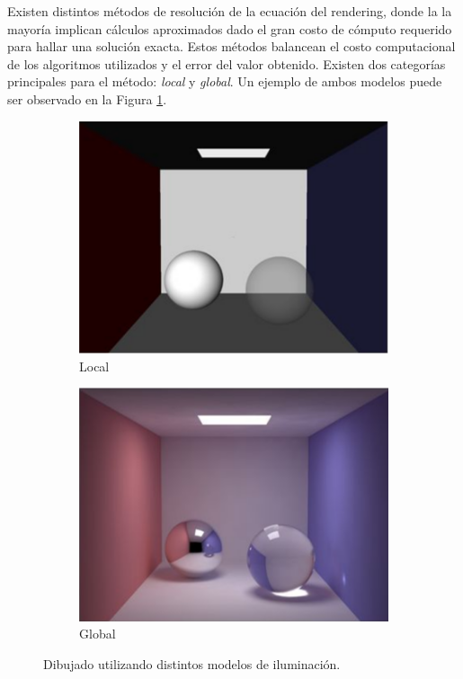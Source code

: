 Existen distintos métodos de resolución de la ecuación del rendering, donde la la mayoría implican cálculos aproximados dado el gran costo de cómputo requerido para hallar una solución exacta. Estos métodos balancean el costo computacional de los algoritmos utilizados y el error del valor obtenido. Existen dos categorías principales para el método: \textit{local} y \textit{global}. Un ejemplo de ambos modelos puede ser observado en la Figura \ref{local-vs-global-img}.

\vspace{5mm}
\begin{figure}[htbp!]
	\begin{subfigure}{0.5\textwidth}
		  	\centering
   		 	\includegraphics[width=1\linewidth]{assets/local}
   		 	\caption{Local}
   	\end{subfigure}
    \begin{subfigure}{0.5\textwidth}
    	\centering
    	\includegraphics[width=1\linewidth]{assets/global}
    	\caption{Global}
    \end{subfigure}
    \caption{Dibujado utilizando distintos modelos de iluminación.}
    \label{local-vs-global-img}
\end{figure}

